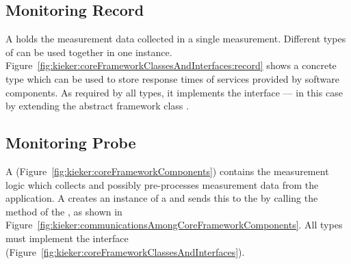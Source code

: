\subsection{Monitoring Record}\label{sec:architecture:record}

\noindent A \MonitoringRecord{} holds the measurement data collected in a single measurement. %
Different types of \MonitoringRecords{} can be used together in one \KiekerTpmon{} %
instance. %
Figure~\ref{fig:kieker:coreFrameworkClassesAndInterfaces:record} shows a %
concrete \MonitoringRecord{} type  which can be used %
to store response times of services provided by software components. %
As required by all \MonitoringRecord{} types, it implements the interface ---%
in this case by extending the abstract framework class . %

\subsection{Monitoring Probe}\label{sec:monitoringProbe}
% 
% 
\noindent A \MonitoringProbe{} (Figure~\ref{fig:kieker:coreFrameworkComponents}) contains the measurement logic which collects and possibly %
pre-processes measurement data from the application. %
A \MonitoringProbe{} creates an instance of a \MonitoringRecord{} and sends this %
\MonitoringRecord{} to the \TpmonController{} by calling the
method  of the \TpmonController{}, as shown in %
Figure~\ref{fig:kieker:communicationsAmongCoreFrameworkComponents}. %
All \MonitoringProbe{} types must implement the interface  (Figure~\ref{fig:kieker:coreFrameworkClassesAndInterfaces}). %


